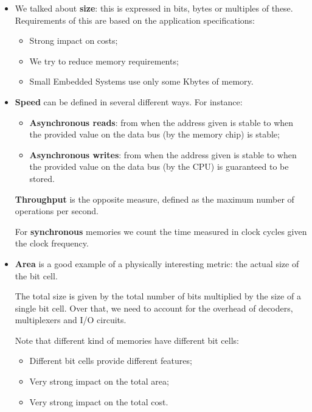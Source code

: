 \documentclass[a4paper,11pt]{article}
\begin{document}
\begin{itemize}
	\item We talked about \textbf{size}: this is expressed in bits, bytes or multiples of these. Requirements of this are based on the application specifications:
	      \begin{itemize}
		      \item Strong impact on costs;
		      \item We try to reduce memory requirements;
		      \item Small Embedded Systems use only some Kbytes of memory.
	      \end{itemize}

	\item \textbf{Speed} can be defined in several different ways. For instance:
	      \begin{itemize}
		      \item \textbf{Asynchronous reads}: from when the address given is stable to when the provided value on the data bus (by the memory chip) is stable;
		      \item \textbf{Asynchronous writes}: from when the address given is stable to when the provided value on the data bus (by the CPU) is guaranteed to be stored.
	      \end{itemize}

	      \textbf{Throughput} is the opposite measure, defined as the maximum number of operations per second.

	      For \textbf{synchronous} memories we count the time measured in clock cycles given the clock frequency.

	\item \textbf{Area} is a good example of a physically interesting metric: the actual size of the bit cell.

	      The total size is given by the total number of bits multiplied by the size of a single bit cell.
	      Over that, we need to account for the overhead of decoders, multiplexers and I/O circuits.

	      Note that different kind of memories have different bit cells:
	      \begin{itemize}
		      \item Different bit cells provide different features;
		      \item Very strong impact on the total area;
		      \item Very strong impact on the total cost.
	      \end{itemize}


\end{itemize}
\end{document}
